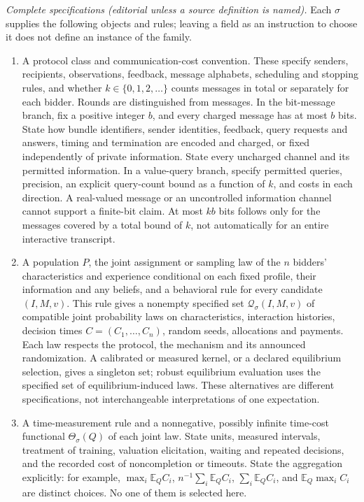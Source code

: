 \documentclass[11pt,a4paper]{article}
\begin{document}
\emph{Complete specifications (editorial unless a source definition is named).} Each \(\sigma\) supplies the following objects and rules; leaving a field as an instruction to choose it does not define an instance of the family.
\begin{enumerate}
\item A protocol class and communication-cost convention. These specify senders, recipients, observations, feedback, message alphabets, scheduling and stopping rules, and whether \(k\in\{0,1,2,\ldots\}\) counts messages in total or separately for each bidder. Rounds are distinguished from messages. In the bit-message branch, fix a positive integer \(b\), and every charged message has at most \(b\) bits. State how bundle identifiers, sender identities, feedback, query requests and answers, timing and termination are encoded and charged, or fixed independently of private information. State every uncharged channel and its permitted information. In a value-query branch, specify permitted queries, precision, an explicit query-count bound as a function of \(k\), and costs in each direction. A real-valued message or an uncontrolled information channel cannot support a finite-bit claim. At most \(kb\) bits follows only for the messages covered by a total bound of \(k\), not automatically for an entire interactive transcript.
\item A population \(P\), the joint assignment or sampling law of the \(n\) bidders' characteristics and experience conditional on each fixed profile, their information and any beliefs, and a behavioral rule for every candidate \((I,M,v)\). This rule gives a nonempty specified set \(\mathcal Q_\sigma(I,M,v)\) of compatible joint probability laws on characteristics, interaction histories, decision times \(C=(C_1,\ldots,C_n)\), random seeds, allocations and payments. Each law respects the protocol, the mechanism and its announced randomization. A calibrated or measured kernel, or a declared equilibrium selection, gives a singleton set; robust equilibrium evaluation uses the specified set of equilibrium-induced laws. These alternatives are different specifications, not interchangeable interpretations of one expectation.
\item A time-measurement rule and a nonnegative, possibly infinite time-cost functional \(\Theta_\sigma(Q)\) of each joint law. State units, measured intervals, treatment of training, valuation elicitation, waiting and repeated decisions, and the recorded cost of noncompletion or timeouts. State the aggregation explicitly: for example, \(\max_i\mathbb E_Q C_i\), \(n^{-1}\sum_i\mathbb E_Q C_i\), \(\sum_i\mathbb E_Q C_i\), and \(\mathbb E_Q\max_i C_i\) are distinct choices. No one of them is selected here.

\end{enumerate}
\end{document}
